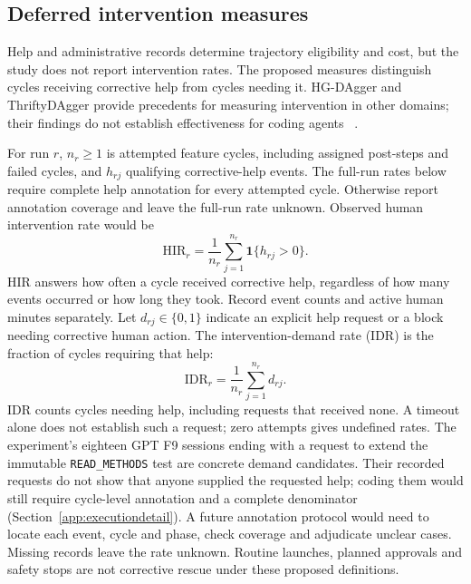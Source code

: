 \subsection{Deferred intervention measures}\label{app:deferredmeasures}

Help and administrative records determine trajectory eligibility and cost,
but the study does not report intervention rates. The proposed measures
distinguish cycles receiving corrective help from cycles needing it. HG-DAgger and
ThriftyDAgger provide precedents for measuring intervention in other domains;
their findings do not establish effectiveness for coding agents
~\cite{kelly2019hgdagger,hoque2022thriftydagger}.

For run $r$, $n_r\geq1$ is attempted feature cycles, including assigned
post-steps and failed cycles, and $h_{rj}$ qualifying corrective-help
events. The full-run rates below require complete help annotation for every
attempted cycle. Otherwise report annotation coverage and leave the full-run
rate unknown. Observed human intervention rate would be
\begin{equation}
\mathrm{HIR}_r=\frac{1}{n_r}\sum_{j=1}^{n_r}
\mathbf{1}\{h_{rj}>0\}.
\label{eq:hir}
\end{equation}
HIR answers how often a cycle received corrective help, regardless of how
many events occurred or how long they took. Record event counts and active
human minutes separately. Let $d_{rj}\in\{0,1\}$ indicate an explicit
help request or a block needing corrective human action. The
intervention-demand rate (IDR) is the fraction of cycles requiring that help:
\begin{equation}
\mathrm{IDR}_r=\frac{1}{n_r}\sum_{j=1}^{n_r}d_{rj}.
\label{eq:intervention-demand}
\end{equation}
IDR counts cycles needing help, including requests that received none.
A timeout alone does not establish such a request; zero attempts gives
undefined rates. The experiment's eighteen GPT F9 sessions ending with
a request to extend the immutable \texttt{READ\_METHODS} test are
concrete demand candidates. Their recorded requests do not show that
anyone supplied the requested help; coding them would still require
cycle-level annotation and a complete denominator
(Section~\ref{app:executiondetail}).
A future annotation protocol would need to locate each event, cycle and
phase, check coverage and adjudicate unclear cases. Missing records leave
the rate unknown. Routine launches, planned approvals and safety stops are
not corrective rescue under these proposed definitions.

